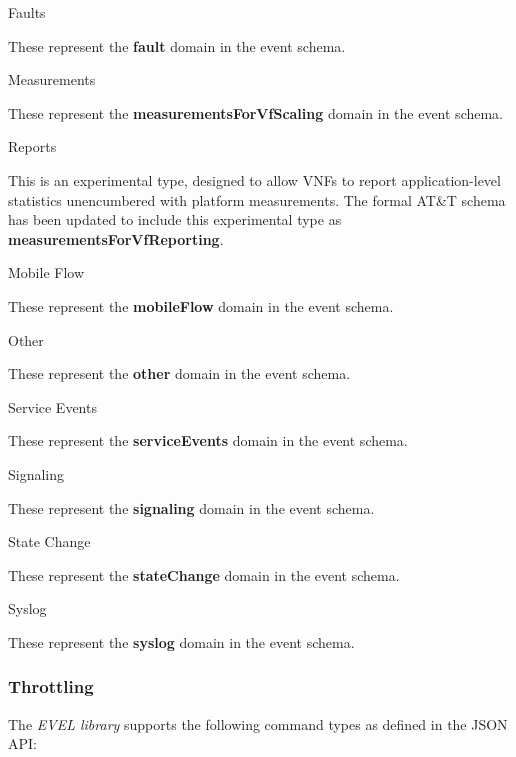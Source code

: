\begin{DoxyEnumerate}
\item Faults

These represent the {\bfseries fault} domain in the event schema.
\item Measurements

These represent the {\bfseries measurements\+For\+Vf\+Scaling} domain in the event schema.
\item Reports

This is an experimental type, designed to allow V\+N\+Fs to report application-\/level statistics unencumbered with platform measurements. The formal AT\&T schema has been updated to include this experimental type as {\bfseries measurements\+For\+Vf\+Reporting}.
\item Mobile Flow

These represent the {\bfseries mobile\+Flow} domain in the event schema.
\item Other

These represent the {\bfseries other} domain in the event schema.
\item Service Events

These represent the {\bfseries service\+Events} domain in the event schema.
\item Signaling

These represent the {\bfseries signaling} domain in the event schema.
\item State Change

These represent the {\bfseries state\+Change} domain in the event schema.
\item Syslog

These represent the {\bfseries syslog} domain in the event schema.
\end{DoxyEnumerate}\hypertarget{quickstart_qs_throttling}{}\subsubsection{Throttling}\label{quickstart_qs_throttling}
The {\itshape E\+V\+EL library} supports the following command types as defined in the J\+S\+ON A\+PI\+:


